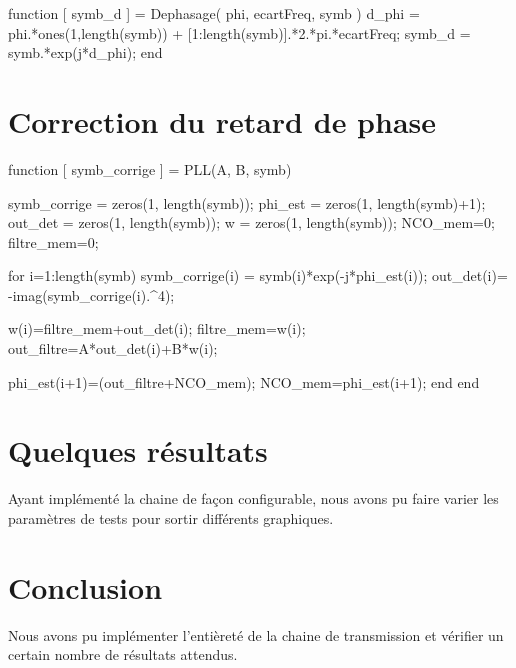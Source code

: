 \documentclass[a4paper,11pt]{article}
\begin{document}
\begin{lstun}
	function [ symb_d ] = Dephasage( phi, ecartFreq, symb )
	d_phi = phi.*ones(1,length(symb)) + [1:length(symb)].*2.*pi.*ecartFreq;
	symb_d = symb.*exp(j*d_phi);
	end
\end{lstun}

\section{Correction du retard de phase}

\begin{lstun}
	function [ symb_corrige ] = PLL(A, B, symb)
	
	symb_corrige = zeros(1, length(symb));
	phi_est = zeros(1, length(symb)+1);
	out_det = zeros(1, length(symb));
	w = zeros(1, length(symb));
	NCO_mem=0;      %
	filtre_mem=0;   %
	
	for i=1:length(symb)
	symb_corrige(i) = symb(i)*exp(-j*phi_est(i));
	out_det(i)= -imag(symb_corrige(i).^4);
	
	w(i)=filtre_mem+out_det(i); %
	filtre_mem=w(i);            
	out_filtre=A*out_det(i)+B*w(i);   %
	
	phi_est(i+1)=(out_filtre+NCO_mem); %
	NCO_mem=phi_est(i+1);
	end
	end	
\end{lstun}

\section{Quelques résultats}
Ayant implémenté la chaine de façon configurable, nous avons pu faire varier les paramètres de tests pour sortir différents graphiques. 

\section{Conclusion}
Nous avons pu implémenter l'entièreté de la chaine de transmission et vérifier un certain nombre de résultats attendus. 

\newpage
\end{document}

